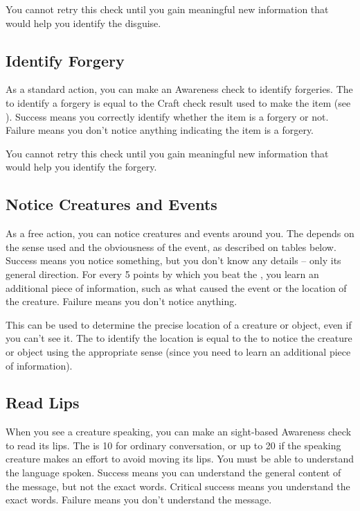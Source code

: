         You cannot retry this check until you gain meaningful new information that would help you identify the disguise.

    \subsection{Identify Forgery}
        As a standard action, you can make an Awareness check to identify forgeries.
        The  to identify a forgery is equal to the Craft check result used to make the item (see ).
        Success means you correctly identify whether the item is a forgery or not.
        Failure means you don't notice anything indicating the item is a forgery.

        You cannot retry this check until you gain meaningful new information that would help you identify the forgery.

    \subsection{Notice Creatures and Events}
        As a free action, you can notice creatures and events around you.
        The  depends on the sense used and the obviousness of the event, as described on tables below.
        Success means you notice something, but you don't know any details -- only its general direction.
        For every 5 points by which you beat the , you learn an additional piece of information, such as what caused the event or the location of the creature.
        Failure means you don't notice anything.

        This can be used to determine the precise location of a creature or object, even if you can't see it. The  to identify the location is equal to the  to notice the creature or object using the appropriate sense  (since you need to learn an additional piece of information).

    \subsection{Read Lips}
        When you see a creature speaking, you can make an sight-based Awareness check to read its lips.
        The  is 10 for ordinary conversation, or up to 20 if the speaking creature makes an effort to avoid moving its lips.
        You must be able to understand the language spoken.
        Success means you can understand the general content of the message, but not the exact words.
        Critical success means you understand the exact words.
        Failure means you don't understand the message.

